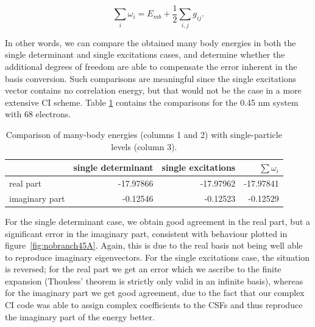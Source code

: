 \begin{equation}
	\sum_i \omega_i = E_{mb} + \frac{1}{2} \sum_{i,j} g_{ij}.
	\label{eq:eesumcomparison}
\end{equation}

In other words, we can compare the obtained many body energies in both the
single determinant and single excitations cases, and determine whether the
additional degrees of freedom are able to compensate the error inherent in the
basis conversion. Such comparisons are meaningful since the single excitations
vector contains no correlation energy, but that would not be the case in a more
extensive \ac{CI} scheme. Table \ref{tab:eesum} contains the comparisons for
the 0.45 nm system with 68 electrons.

\begin{table}
  \centering
  \begin{tabular}{l r r r} 
    \hline
                 & single determinant & single excitations & $\sum \omega_i$ \\
    \hline
    real part      & -17.97866 & -17.97962 & -17.97841\\
    imaginary part & -0.12546 & -0.12523 & -0.12529\\
    \hline
  \end{tabular}
  \caption{Comparison of many-body energies (columns 1 and 2) with
           single-particle levels (column 3).}
  \label{tab:eesum}
\end{table}

For the single determinant case, we obtain good agreement in the real part, but
a significant error in the imaginary part, consistent with behaviour plotted in
figure~\ref{fig:nobranch45A}. Again, this is due to the real basis not being 
well able to reproduce imaginary eigenvectors. For the single excitations case,
the situation is reversed; for the real part we get an error which we ascribe
to the finite expansion (Thouless' theorem is strictly only valid in an
infinite basis), whereas for the imaginary part we get good agreement, due to
the fact that our complex \ac{CI} code was able to assign complex coefficients
to the \acp{CSF} and thus reproduce the imaginary part of the energy better.

